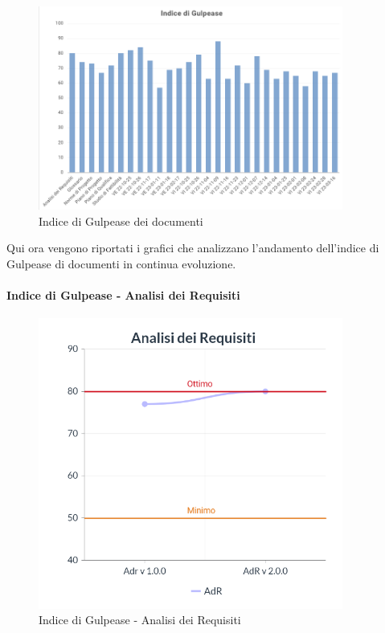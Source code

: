 \begin{center}
\begin{figure}[H]
  \centering
  \renewcommand{\thefigure}{7}
  \includegraphics[width=10cm]{./res/images/GulpeaseGen.png}
  \caption{Indice di Gulpease dei documenti}
  \label{fig:Indice di Gulpease dei documenti}
\end{figure}
\end{center}
\pagebreak
\noindent Qui ora vengono riportati i grafici che analizzano l'andamento dell'indice di Gulpease di documenti in continua evoluzione.
\paragraph{Indice di Gulpease - Analisi dei Requisiti}
\begin{center}
\begin{figure}[H]
  \centering
  \renewcommand{\thefigure}{8}
  \includegraphics[width=10cm]{./res/images/AdRGraph.png}
  \caption{Indice di Gulpease - Analisi dei Requisiti}
  \label{fig:Indice di Gulpease - Analisi dei Requisiti}
\end{figure}
\end{center}
\pagebreak
